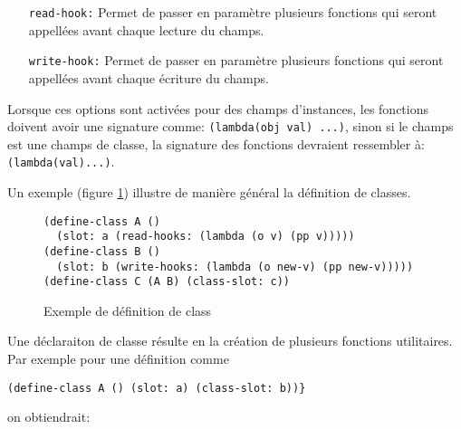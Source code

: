       \begin{itemize}
      \item[\texttt{read-hook:}] Permet de passer en paramètre
        plusieurs fonctions qui seront appellées avant chaque lecture
        du champs.
      \item[\texttt{write-hook:}] Permet de passer en paramètre
        plusieurs fonctions qui seront appellées avant chaque écriture
        du champs.
      \end{itemize}

      Lorsque ces options sont activées pour des champs d'instances,
      les fonctions doivent avoir une signature comme:
      \texttt{(lambda(obj val) ...)}, sinon si le champs est une
      champs de classe, la signature des fonctions devraient
      ressembler à: \texttt{(lambda(val)...)}.

      Un exemple (figure \ref{ex-defclass}) illustre de manière
      général la définition de classes.

      \begin{figure}[htbp!]
        \begin{lstlisting}
(define-class A () 
  (slot: a (read-hooks: (lambda (o v) (pp v)))))
(define-class B () 
  (slot: b (write-hooks: (lambda (o new-v) (pp new-v)))))
(define-class C (A B) (class-slot: c))
        \end{lstlisting}
        \caption{Exemple de définition de class}
        \label{ex-defclass}
      \end{figure}

      Une déclaraiton de classe résulte en la création de plusieurs
      fonctions utilitaires. Par exemple pour une définition comme
      \begin{lstlisting}
(define-class A () (slot: a) (class-slot: b))}
      \end{lstlisting}
      on obtiendrait:

